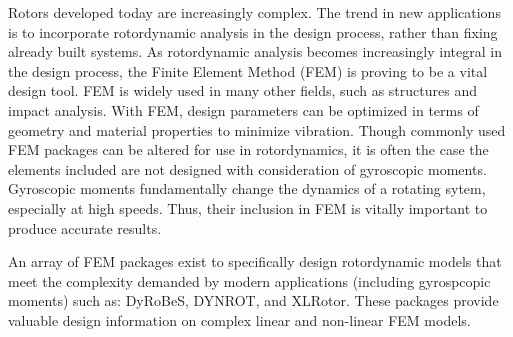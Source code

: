 Rotors developed today are increasingly complex. The trend in new applications is to incorporate rotordynamic analysis in the design process, rather than fixing already built systems. As rotordynamic analysis becomes increasingly integral in the design process, the Finite Element Method (FEM) is proving to be a vital design tool. FEM is widely used in many other fields, such as structures and impact analysis. With FEM, design parameters can be optimized in terms of geometry and material properties to minimize vibration. Though commonly used FEM packages can be altered for use in rotordynamics, it is often the case the elements included are not designed with consideration of gyroscopic moments. Gyroscopic moments fundamentally change the dynamics of a rotating sytem, especially at high speeds. Thus, their inclusion in FEM is vitally important to produce accurate results.\par 
An array of FEM packages exist to specifically design rotordynamic models that meet the complexity demanded by modern applications (including gyrospcopic moments) such as: DyRoBeS, DYNROT, and XLRotor. These packages provide valuable design information on complex linear and non-linear FEM models.\par
